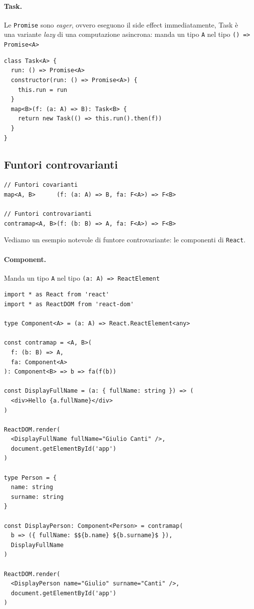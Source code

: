 \documentclass[12pt]{article}
\begin{document}
\paragraph{Task.}

Le \texttt{Promise} sono \emph{eager}, ovvero eseguono il side effect immediatamente, Task è una variante \emph{lazy}
di una computazione asincrona: manda un tipo \texttt{A} nel tipo \texttt{() => Promise<A>}

\begin{verbatim}
class Task<A> {
  run: () => Promise<A>
  constructor(run: () => Promise<A>) {
    this.run = run
  }
  map<B>(f: (a: A) => B): Task<B> {
    return new Task(() => this.run().then(f))
  }
}
\end{verbatim}

\subsection{Funtori controvarianti}

\begin{verbatim}
// Funtori covarianti
map<A, B>      (f: (a: A) => B, fa: F<A>) => F<B>

// Funtori controvarianti
contramap<A, B>(f: (b: B) => A, fa: F<A>) => F<B>
\end{verbatim}

Vediamo un esempio notevole di funtore controvariante: le componenti di \texttt{React}.

\paragraph{Component.}

Manda un tipo \texttt{A} nel tipo \texttt{(a: A) => ReactElement}

\begin{verbatim}
import * as React from 'react'
import * as ReactDOM from 'react-dom'

type Component<A> = (a: A) => React.ReactElement<any>

const contramap = <A, B>(
  f: (b: B) => A,
  fa: Component<A>
): Component<B> => b => fa(f(b))

const DisplayFullName = (a: { fullName: string }) => (
  <div>Hello {a.fullName}</div>
)

ReactDOM.render(
  <DisplayFullName fullName="Giulio Canti" />,
  document.getElementById('app')
)

type Person = {
  name: string
  surname: string
}

const DisplayPerson: Component<Person> = contramap(
  b => ({ fullName: $${b.name} ${b.surname}$ }),
  DisplayFullName
)

ReactDOM.render(
  <DisplayPerson name="Giulio" surname="Canti" />,
  document.getElementById('app')
)
\end{verbatim}
\end{document}
